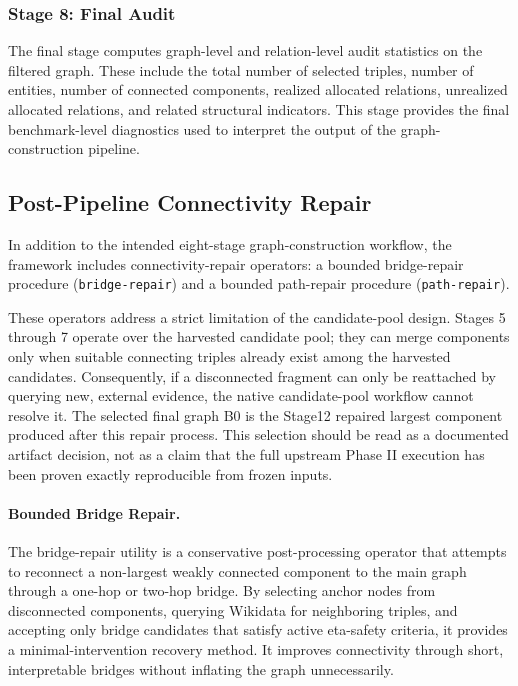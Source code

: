 \documentclass[12pt,a4paper]{article}
\begin{document}
\subsubsection{Stage 8: Final Audit}

The final stage computes graph-level and relation-level audit statistics on the filtered graph. These include the total number of selected triples, number of entities, number of connected components, realized allocated relations, unrealized allocated relations, and related structural indicators. This stage provides the final benchmark-level diagnostics used to interpret the output of the graph-construction pipeline.

\subsection{Post-Pipeline Connectivity Repair}

In addition to the intended eight-stage graph-construction workflow, the framework includes connectivity-repair operators: a bounded bridge-repair procedure (\texttt{bridge-repair}) and a bounded path-repair procedure (\texttt{path-repair}).

These operators address a strict limitation of the candidate-pool design. Stages 5 through 7 operate over the harvested candidate pool; they can merge components only when suitable connecting triples already exist among the harvested candidates. Consequently, if a disconnected fragment can only be reattached by querying new, external evidence, the native candidate-pool workflow cannot resolve it. The selected final graph B0 is the Stage12 repaired largest component produced after this repair process. This selection should be read as a documented artifact decision, not as a claim that the full upstream Phase II execution has been proven exactly reproducible from frozen inputs.

\paragraph{Bounded Bridge Repair.} 
The bridge-repair utility is a conservative post-processing operator that attempts to reconnect a non-largest weakly connected component to the main graph through a one-hop or two-hop bridge. By selecting anchor nodes from disconnected components, querying Wikidata for neighboring triples, and accepting only bridge candidates that satisfy active eta-safety criteria, it provides a minimal-intervention recovery method. It improves connectivity through short, interpretable bridges without inflating the graph unnecessarily.
\end{document}

